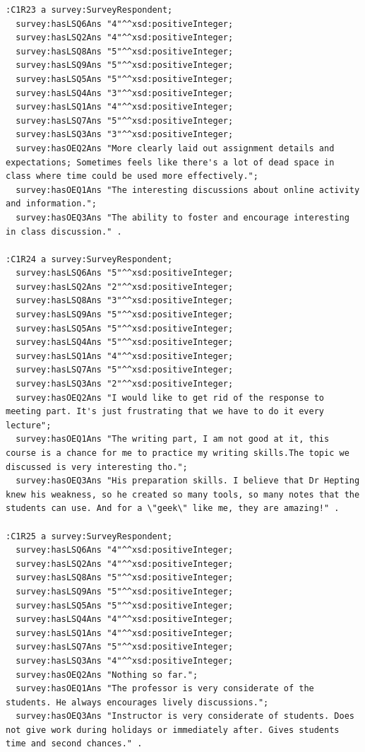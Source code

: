 \begin{lstlisting}
:C1R23 a survey:SurveyRespondent;
  survey:hasLSQ6Ans "4"^^xsd:positiveInteger;
  survey:hasLSQ2Ans "4"^^xsd:positiveInteger;
  survey:hasLSQ8Ans "5"^^xsd:positiveInteger;
  survey:hasLSQ9Ans "5"^^xsd:positiveInteger;
  survey:hasLSQ5Ans "5"^^xsd:positiveInteger;
  survey:hasLSQ4Ans "3"^^xsd:positiveInteger;
  survey:hasLSQ1Ans "4"^^xsd:positiveInteger;
  survey:hasLSQ7Ans "5"^^xsd:positiveInteger;
  survey:hasLSQ3Ans "3"^^xsd:positiveInteger;
  survey:hasOEQ2Ans "More clearly laid out assignment details and expectations; Sometimes feels like there's a lot of dead space in class where time could be used more effectively.";
  survey:hasOEQ1Ans "The interesting discussions about online activity and information.";
  survey:hasOEQ3Ans "The ability to foster and encourage interesting in class discussion." .

:C1R24 a survey:SurveyRespondent;
  survey:hasLSQ6Ans "5"^^xsd:positiveInteger;
  survey:hasLSQ2Ans "2"^^xsd:positiveInteger;
  survey:hasLSQ8Ans "3"^^xsd:positiveInteger;
  survey:hasLSQ9Ans "5"^^xsd:positiveInteger;
  survey:hasLSQ5Ans "5"^^xsd:positiveInteger;
  survey:hasLSQ4Ans "5"^^xsd:positiveInteger;
  survey:hasLSQ1Ans "4"^^xsd:positiveInteger;
  survey:hasLSQ7Ans "5"^^xsd:positiveInteger;
  survey:hasLSQ3Ans "2"^^xsd:positiveInteger;
  survey:hasOEQ2Ans "I would like to get rid of the response to meeting part. It's just frustrating that we have to do it every lecture";
  survey:hasOEQ1Ans "The writing part, I am not good at it, this course is a chance for me to practice my writing skills.The topic we discussed is very interesting tho.";
  survey:hasOEQ3Ans "His preparation skills. I believe that Dr Hepting knew his weakness, so he created so many tools, so many notes that the students can use. And for a \"geek\" like me, they are amazing!" .

:C1R25 a survey:SurveyRespondent;
  survey:hasLSQ6Ans "4"^^xsd:positiveInteger;
  survey:hasLSQ2Ans "4"^^xsd:positiveInteger;
  survey:hasLSQ8Ans "5"^^xsd:positiveInteger;
  survey:hasLSQ9Ans "5"^^xsd:positiveInteger;
  survey:hasLSQ5Ans "5"^^xsd:positiveInteger;
  survey:hasLSQ4Ans "4"^^xsd:positiveInteger;
  survey:hasLSQ1Ans "4"^^xsd:positiveInteger;
  survey:hasLSQ7Ans "5"^^xsd:positiveInteger;
  survey:hasLSQ3Ans "4"^^xsd:positiveInteger;
  survey:hasOEQ2Ans "Nothing so far.";
  survey:hasOEQ1Ans "The professor is very considerate of the students. He always encourages lively discussions.";
  survey:hasOEQ3Ans "Instructor is very considerate of students. Does not give work during holidays or immediately after. Gives students time and second chances." .


\end{lstlisting}
